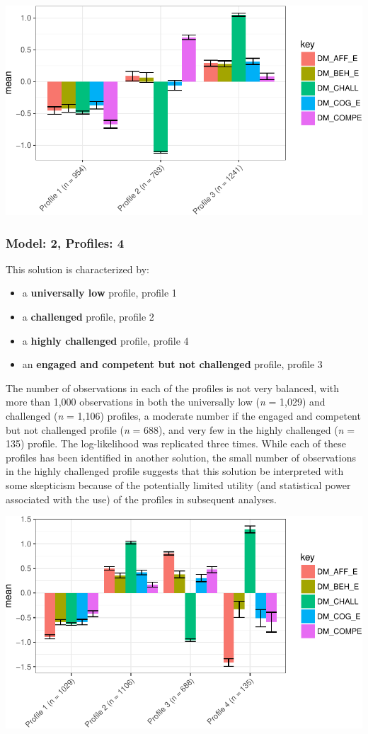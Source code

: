 \documentclass[]{msu-thesis}
\providecommand{\tightlist}{%
  \setlength{\itemsep}{0pt}\setlength{\parskip}{0pt}}
\theoremstyle{definition}
\theoremstyle{definition}
\theoremstyle{definition}
\theoremstyle{remark}
\begin{document}
\begin{center}\includegraphics[width=0.8\linewidth]{rosenberg-dissertation_files/figure-latex/m2_3p-1} \end{center}

\subsubsection{Model: 2, Profiles: 4}\label{model-2-profiles-4}

This solution is characterized by:

\begin{itemize}
\tightlist
\item
  a \textbf{universally low} profile, profile 1
\item
  a \textbf{challenged} profile, profile 2
\item
  a \textbf{highly challenged} profile, profile 4
\item
  an \textbf{engaged and competent but not challenged} profile, profile
  3
\end{itemize}

The number of observations in each of the profiles is not very balanced,
with more than 1,000 observations in both the universally low (\emph{n}
= 1,029) and challenged (\emph{n} = 1,106) profiles, a moderate number
if the engaged and competent but not challenged profile (\emph{n} =
688), and very few in the highly challenged (\emph{n} = 135) profile.
The log-likelihood was replicated three times. While each of these
profiles has been identified in another solution, the small number of
observations in the highly challenged profile suggests that this
solution be interpreted with some skepticism because of the potentially
limited utility (and statistical power associated with the use) of the
profiles in subsequent analyses.

\begin{center}\includegraphics[width=0.8\linewidth]{rosenberg-dissertation_files/figure-latex/m2_4p-1} \end{center}
\end{document}

